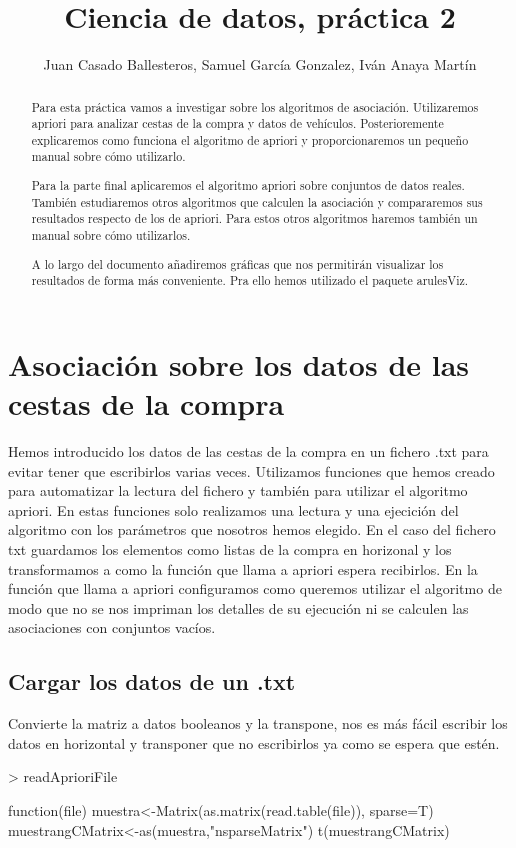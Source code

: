 \documentclass [a4paper] {article}
\title{Ciencia de datos, práctica 2}
\author{Juan Casado Ballesteros, Samuel García Gonzalez, Iván Anaya Martín}
\begin{document}
\maketitle

\begin{abstract}
Para esta práctica vamos a investigar sobre los algoritmos de asociación.
Utilizaremos apriori para analizar cestas de la compra y datos de vehículos.
Posterioremente explicaremos como funciona el algoritmo de apriori y proporcionaremos un pequeño manual sobre cómo utilizarlo.

Para la parte final aplicaremos el algoritmo apriori sobre conjuntos de datos reales.
También estudiaremos otros algoritmos que calculen la asociación y compararemos sus resultados respecto de los de apriori.
Para estos otros algoritmos haremos también un manual sobre cómo utilizarlos.

A lo largo del documento añadiremos gráficas que nos permitirán visualizar los resultados de forma más conveniente.
Pra ello hemos utilizado el paquete arulesViz.
\end{abstract}

\newpage
\tableofcontents
\newpage


\section{Asociación sobre los datos de las cestas de la compra}
Hemos introducido los datos de las cestas de la compra en un fichero .txt para evitar tener que escribirlos varias veces.
Utilizamos funciones que hemos creado para automatizar la lectura del fichero y también para utilizar el algoritmo apriori.
En estas funciones solo realizamos una lectura y una ejecición del algoritmo con los parámetros que nosotros hemos elegido.
En el caso del fichero txt guardamos los elementos como listas de la compra en horizonal y los transformamos a como la función que llama a apriori espera recibirlos.
En la función que llama a apriori configuramos como queremos utilizar el algoritmo de modo que no se nos impriman los detalles de su ejecución
ni se calculen las asociaciones con conjuntos vacíos.

\subsection{Cargar los datos de un .txt}
Convierte la matriz a datos booleanos y la transpone, nos es más fácil escribir los datos en horizontal y transponer que no escribirlos ya como se espera que estén.
\begin{Schunk}
\begin{Sinput}
> readAprioriFile
\end{Sinput}
\begin{Soutput}
function(file){
  muestra<-Matrix(as.matrix(read.table(file)), sparse=T)
  muestrangCMatrix<-as(muestra,"nsparseMatrix")
  t(muestrangCMatrix)
}
\end{Soutput}
\end{Schunk}
\end{document}

